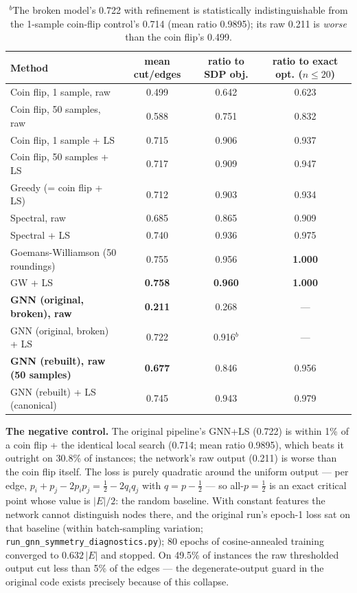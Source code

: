 \documentclass[11pt]{article}
\begin{document}
\begin{table}[h]
\centering
\caption{The ablation: mean cut per edge and approximation ratios. ``raw'' = without the shared 1-opt local search. Ratios to the SDP objective are proxies (SCS solution); ratios to the exact optimum (150 instances, $n \leq 20$) are rigorous.}
\label{tab:ablation}
\begin{tabular}{lccc}
\toprule
\textbf{Method} & \textbf{mean cut/edges} & \textbf{ratio to SDP obj.} & \textbf{ratio to exact opt. ($n{\leq}20$)} \\
\midrule
Coin flip, 1 sample, raw & 0.499 & 0.642 & 0.623 \\
Coin flip, 50 samples, raw & 0.588 & 0.751 & 0.832 \\
Coin flip, 1 sample + LS & 0.715 & 0.906 & 0.937 \\
Coin flip, 50 samples + LS & 0.717 & 0.909 & 0.947 \\
Greedy (= coin flip + LS) & 0.712 & 0.903 & 0.934 \\
Spectral, raw & 0.685 & 0.865 & 0.909 \\
Spectral + LS & 0.740 & 0.936 & 0.975 \\
Goemans-Williamson (50 roundings) & 0.755 & 0.956 & \textbf{1.000} \\
GW + LS & \textbf{0.758} & \textbf{0.960} & \textbf{1.000} \\
\textbf{GNN (original, broken), raw} & \textbf{0.211} & 0.268 & --- \\
GNN (original, broken) + LS & 0.722 & 0.916$^{b}$ & --- \\
\textbf{GNN (rebuilt), raw (50 samples)} & \textbf{0.677} & 0.846 & 0.956 \\
GNN (rebuilt) + LS (canonical) & 0.745 & 0.943 & 0.979 \\
\bottomrule
\end{tabular}
\caption*{\footnotesize $^{b}$The broken model's 0.722 with refinement is statistically indistinguishable from the 1-sample coin-flip control's 0.714 (mean ratio 0.9895); its raw 0.211 is \emph{worse} than the coin flip's 0.499.}
\end{table}

\textbf{The negative control.} The original pipeline's GNN+LS (0.722) is within 1\% of a coin flip + the identical local search (0.714; mean ratio 0.9895), which beats it outright on 30.8\% of instances; the network's raw output (0.211) is worse than the coin flip itself. The loss is purely quadratic around the uniform output --- per edge, $p_i{+}p_j{-}2p_ip_j = \tfrac12 - 2q_iq_j$ with $q = p - \tfrac12$ --- so all-$p{=}\tfrac12$ is an exact critical point whose value is $|E|/2$: the random baseline. With constant features the network cannot distinguish nodes there, and the original run's epoch-1 loss sat on that baseline (within batch-sampling variation; \texttt{run\_gnn\_symmetry\_diagnostics.py}); 80 epochs of cosine-annealed training converged to $0.632\,|E|$ and stopped. On 49.5\% of instances the raw thresholded output cut less than 5\% of the edges --- the degenerate-output guard in the original code exists precisely because of this collapse.
\end{document}
